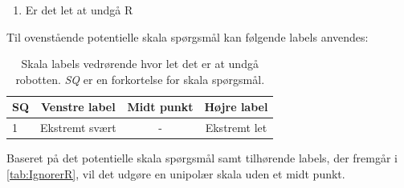%
\begin{enumerate}
  \item Er det let at undgå R\blankline
\end{enumerate} 
\noindent
%
Til ovenstående potentielle skala spørgsmål kan følgende labels anvendes:
%
\begin{table}[H]
	\centering
	\begin{tabular}{l|c|c|c}
		SQ     & Venstre label & Midt punkt & Højre label \\\hline
		1   & Ekstremt svært & - & Ekstremt let                 
	\end{tabular}
\caption{Skala labels vedrørende hvor let det er at undgå robotten. \textit{SQ} er en forkortelse for skala spørgsmål.}
	\label{tab:IgnorerR} 
\end{table}
\noindent
%
Baseret på det potentielle skala spørgsmål samt tilhørende labels, der fremgår i \autoref{tab:IgnorerR}, vil det udgøre en unipolær skala uden et midt punkt. 
%
\newpage
